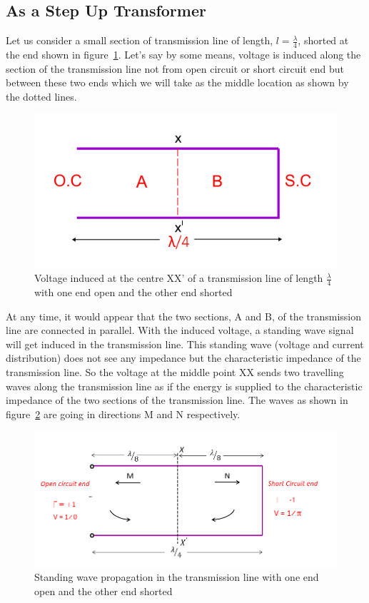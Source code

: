 \subsection{As a Step Up Transformer}
Let us consider a small section of transmission line of length, $l = \frac{\lambda}{4}$, shorted at the end shown in figure~\ref{fig:fig5}. Let's say by some means, voltage is induced along the section of the transmission line not from open circuit or short circuit end but between these two ends which we will take as the middle location as shown by the dotted lines.
\begin{figure}[h]
\centering
\includegraphics[width=1\linewidth]{./graphics/fig5}
\caption{Voltage induced at the centre XX' of a transmission line of length $\frac{\lambda}{4}$ with one end open and the other end shorted}
\label{fig:fig5}
\end{figure}

 At any time, it would appear that the two sections, A and B, of the transmission line are connected in parallel. With the induced voltage, a standing wave signal will get induced in the transmission line. This standing wave (voltage and current distribution) does not see any impedance but the characteristic impedance of the transmission line. So the voltage at the middle point XX sends two travelling waves along the transmission line as if the energy is supplied to the characteristic impedance of the two sections of the transmission line. The waves as shown in figure~\ref{fig:fig6} are going in directions M and N respectively.
 \begin{figure}[h]
\centering
\includegraphics[width=1.1\linewidth]{./graphics/step_up_transformer_application}
\caption{Standing wave propagation in the transmission line with one end open and the other end shorted}
\label{fig:fig6}
\end{figure}

